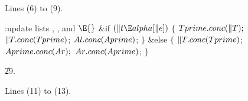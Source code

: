 Lines (6) to (9).

\Y\B\4:update lists , , and \X${}\E{}$\6
\&{if} ${}(\|t\E\\{alpha}[\|e]){}$\5
${}\{{}$\1\6
${}\\{Tprime}.\\{conc}(\|T);{}$\6
${}\|T.\\{conc}(\\{Tprime}){}$;\6
${}\\{Al}.\\{conc}(\\{Aprime}){}$;\6
\4${}\}{}$\2\6
\&{else}\5
${}\{{}$\1\6
${}\|T.\\{conc}(\\{Tprime}){}$;\6
${}\\{Aprime}.\\{conc}(\\{Ar});{}$\6
${}\\{Ar}.\\{conc}(\\{Aprime}){}$;\6
\4${}\}{}$\2\par
\U29.\fi

Lines (11) to (13).

